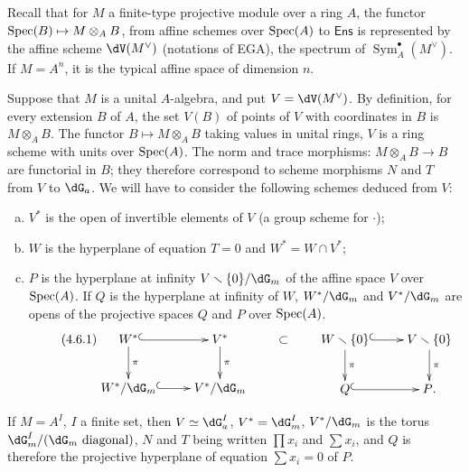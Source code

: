 \subsection{}\label{VI:4-6}

Recall that for $M$ a finite-type projective module over a ring $A$, the
functor $\operatorname{Spec}(B)\mapsto M\otimes_A B$, from affine schemes over $\operatorname{Spec}(A)$
to $\mathsf{Ens}$ is represented by the affine scheme $\dV(M^\vee)$
(notations of EGA), the spectrum of $\operatorname{Sym}_A^\bullet(M^\vee)$. If
$M=A^n$, it is the typical affine space of dimension $n$.

Suppose that $M$ is a unital $A$-algebra, and put
$V=\dV(M^\vee)$. By definition, for every extension $B$ of $A$, the set
$V(B)$ of points of $V$ with coordinates in $B$ is $M\otimes_A B$. The
functor $B\mapsto M\otimes_A B$ taking values in unital
rings, $V$ is a ring scheme with units over $\operatorname{Spec}(A)$. The
norm and trace morphisms: $M\otimes_A B\to B$ are functorial in $B$; they
therefore correspond to scheme morphisms $N$ and $T$ from $V$ to
$\dG_a$. We will have to consider the following schemes deduced from $V$:
\begin{enumerate}[a)]
  \item $V^\ast$ is the open of invertible elements of $V$ (a group
    scheme for $\cdot$);
  \item $W$ is the hyperplane of equation $T=0$ and $W^\ast=W\cap V^\ast$;
  \item $P$ is the hyperplane at infinity $V\setminus \{0\}/\dG_m$ of the
    affine space $V$ over $\operatorname{Spec}(A)$. If $Q$ is the hyperplane at infinity of $W$,
    $W^\ast/\dG_m$ and $V^\ast/\dG_m$ are opens of the projective spaces
    $Q$ and $P$ over $\operatorname{Spec}(A)$. 
    \begin{equation*}\tag{4.6.1}\label{VI:eq:4-6-1}
    \xymatrix{
      W^\ast \ar@{^{(}->}[r] \ar[d]^-\pi 
        & V^\ast \ar[d]^-\pi \\
      W^\ast/\dG_m \ar@{^{(}->}[r] 
        & V^\ast/\dG_m 
    }\qquad\subset\qquad
    \xymatrix{
      W\setminus \{0\} \ar@{^{(}->}[r] \ar[d]^-\pi 
        & V\setminus \{0\} \ar[d]^-\pi \\
      Q \ar@{^{(}->}[r] 
        & P \text{.}
    }
    \end{equation*}
\end{enumerate}

If $M=A^I$, $I$ a finite set, then $V\simeq \dG_a^I$, $V^\ast=\dG_m^I$,
$V^\ast/\dG_m$ is the torus $\dG_m^I/(\dG_m\text{ diagonal})$, $N$ and $T$
being written $\prod x_i$ and $\sum x_i$, and $Q$ is therefore the
projective hyperplane of equation $\sum x_i=0$ of $P$.

